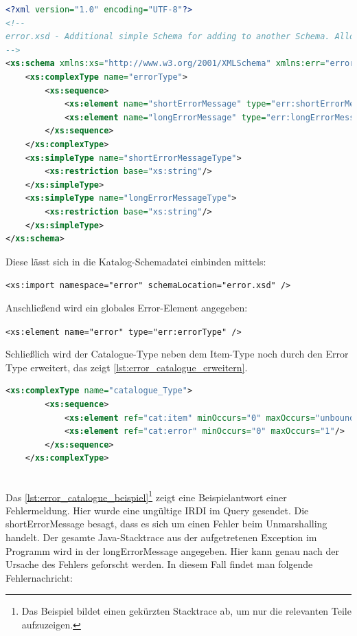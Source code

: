 \begin{lstlisting}[caption=Fehlerbehandlung - Error Schemadatei, language=xml, label=lst:error_schema]
<?xml version="1.0" encoding="UTF-8"?>
<!--
error.xsd - Additional simple Schema for adding to another Schema. Allows Error Messages. 
-->
<xs:schema xmlns:xs="http://www.w3.org/2001/XMLSchema" xmlns:err="error" targetNamespace="error" elementFormDefault="qualified" attributeFormDefault="unqualified">
	<xs:complexType name="errorType">
		<xs:sequence>
			<xs:element name="shortErrorMessage" type="err:shortErrorMessageType" />
			<xs:element name="longErrorMessage" type="err:longErrorMessageType" />
		</xs:sequence>
	</xs:complexType>
	<xs:simpleType name="shortErrorMessageType">
		<xs:restriction base="xs:string"/>
	</xs:simpleType>
	<xs:simpleType name="longErrorMessageType">
		<xs:restriction base="xs:string"/>
	</xs:simpleType>
</xs:schema>
\end{lstlisting}

Diese lässt sich in die Katalog-Schemadatei einbinden mittels:

\lstinline[basicstyle=\ttfamily\small\mdseries]{<xs:import namespace="error" schemaLocation="error.xsd" /> }

Anschließend wird ein globales Error-Element angegeben:

\lstinline[basicstyle=\ttfamily\small\mdseries]{<xs:element name="error" type="err:errorType" />}

Schließlich wird der Catalogue-Type neben dem Item-Type noch durch den Error Type erweitert, das zeigt \autoref{lst:error_catalogue_erweitern}.

 \begin{lstlisting}[caption=Fehlerbehandlung - Catalogue Type erweitern, language=xml, label=lst:error_catalogue_erweitern]
	<xs:complexType name="catalogue_Type">
		<xs:sequence>
			<xs:element ref="cat:item" minOccurs="0" maxOccurs="unbounded"/>
			<xs:element ref="cat:error" minOccurs="0" maxOccurs="1"/>
		</xs:sequence>
	</xs:complexType> 
	
\end{lstlisting} 

Das \autoref{lst:error_catalogue_beispiel}\footnote{Das Beispiel bildet einen gekürzten Stacktrace ab, um nur die relevanten Teile aufzuzeigen.} zeigt eine Beispielantwort einer Fehlermeldung. Hier wurde eine ungültige IRDI im Query gesendet. Die shortErrorMessage besagt, dass es sich um einen Fehler beim Unmarshalling handelt. Der gesamte Java-Stacktrace aus der aufgetretenen Exception im Programm wird in der longErrorMessage angegeben. Hier kann genau nach der Ursache des Fehlers geforscht werden. In diesem Fall findet man folgende Fehlernachricht:

